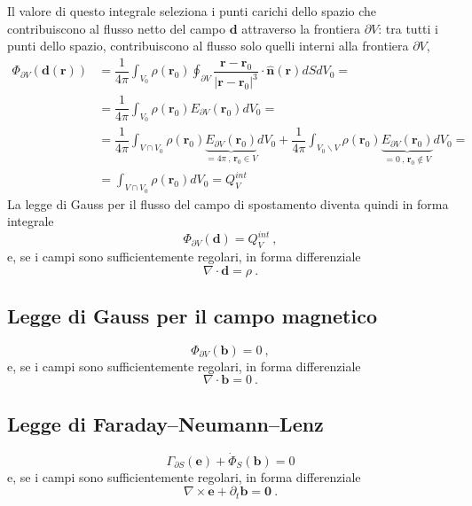 Il valore di questo integrale seleziona i punti carichi dello spazio che contribuiscono al flusso netto del campo $\mathbf{d}$ attraverso la frontiera $\partial V$: tra tutti i punti dello spazio, contribuiscono al flusso solo quelli interni alla frontiera $\partial V$,
\begin{equation}
\begin{aligned}
    \Phi_{\partial V}(\mathbf{d}(\mathbf{r}))
    & = \dfrac{1}{4\pi}  \int_{V_0} \rho(\mathbf{r}_0) \oint_{\partial V} \dfrac{\mathbf{r} - \mathbf{r}_0}{|\mathbf{r} - \mathbf{r}_0|^3} \cdot \mathbf{\hat{n}}(\mathbf{r}) dS dV_0 = \\
    & = \dfrac{1}{4\pi}  \int_{V_0} \rho(\mathbf{r}_0) E_{\partial V}(\mathbf{r}_0) dV_0 = \\
    & = \dfrac{1}{4\pi}  \int_{V \cap V_0} \rho(\mathbf{r}_0) \underbrace{E_{\partial V}(\mathbf{r}_0)}_{=4\pi \ \text{, $\mathbf{r}_0 \in V$}} dV_0 
      + \dfrac{1}{4\pi}  \int_{V_0 \backslash V} \rho(\mathbf{r}_0) \underbrace{ E_{\partial V}(\mathbf{r}_0) }_{=0 \ \text{, $\mathbf{r}_0 \notin V$}} dV_0 = \\
    & = \int_{V \cap V_0} \rho(\mathbf{r}_0) dV_0 = Q_V^{int}
\end{aligned}
\end{equation}
%
La legge di Gauss per il flusso del campo di spostamento diventa quindi in forma integrale
\begin{equation}
    \Phi_{\partial V}(\mathbf{d}) = Q^{int}_V \ ,
\end{equation}
e, se i campi sono sufficientemente regolari, in forma differenziale
\begin{equation}
   \nabla \cdot \mathbf{d} = \rho \ .
\end{equation}

\subsection{Legge di Gauss per il campo magnetico}
\begin{equation}
    \Phi_{\partial V}(\mathbf{b}) = 0 \ ,
\end{equation}
e, se i campi sono sufficientemente regolari, in forma differenziale
\begin{equation}
   \nabla \cdot \mathbf{b} = 0 \ .
\end{equation}

\subsection{Legge di Faraday--Neumann--Lenz}
\begin{equation}
    \Gamma_{\partial S}(\mathbf{e}) + \dot{\Phi}_{S}(\mathbf{b}) = 0
\end{equation}
e, se i campi sono sufficientemente regolari, in forma differenziale
\begin{equation}
    \nabla \times \mathbf{e} + \partial_t \mathbf{b} = \mathbf{0} \ .
\end{equation}

